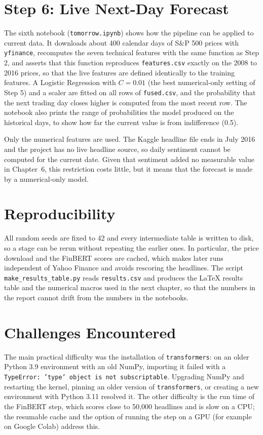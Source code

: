 \section{Step 6: Live Next-Day Forecast}
\label{sec:live}
The sixth notebook (\texttt{tomorrow.ipynb}) shows how the pipeline can be applied to current data. It downloads about 400 calendar days of S\&P 500 prices with \texttt{yfinance}, recomputes the seven technical features with the same function as Step 2, and asserts that this function reproduces \texttt{features.csv} exactly on the 2008 to 2016 prices, so that the live features are defined identically to the training features. A Logistic Regression with $C=0.01$ (the best numerical-only setting of Step 5) and a scaler are fitted on all rows of \texttt{fused.csv}, and the probability that the next trading day closes higher is computed from the most recent row. The notebook also prints the range of probabilities the model produced on the historical days, to show how far the current value is from indifference (0.5).

Only the numerical features are used. The Kaggle headline file ends in July 2016 and the project has no live headline source, so daily sentiment cannot be computed for the current date. Given that sentiment added no measurable value in Chapter~6, this restriction costs little, but it means that the forecast is made by a numerical-only model.

\section{Reproducibility}
All random seeds are fixed to 42 and every intermediate table is written to disk, so a stage can be rerun without repeating the earlier ones. In particular, the price download and the FinBERT scores are cached, which makes later runs independent of Yahoo Finance and avoids rescoring the headlines. The script \texttt{make\_results\_table.py} reads \texttt{results.csv} and produces the \LaTeX{} results table and the numerical macros used in the next chapter, so that the numbers in the report cannot drift from the numbers in the notebooks.

\section{Challenges Encountered}
The main practical difficulty was the installation of \texttt{transformers}: on an older Python 3.9 environment with an old NumPy, importing it failed with a \texttt{TypeError: 'type' object is not subscriptable}. Upgrading NumPy and restarting the kernel, pinning an older version of \texttt{transformers}, or creating a new environment with Python 3.11 resolved it. The other difficulty is the run time of the FinBERT step, which scores close to 50,000 headlines and is slow on a CPU; the resumable cache and the option of running the step on a GPU (for example on Google Colab) address this.
